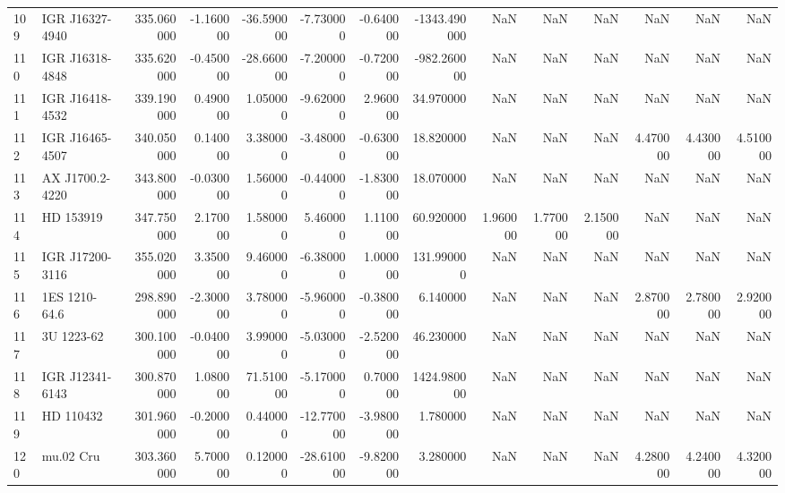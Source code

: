\begin{tabular}{llrrrrrrrrrrrr}
109 & IGR J16327-4940 & 335.060000 & -1.160000 & -36.590000 & -7.730000 & -0.640000 & -1343.490000 & NaN & NaN & NaN & NaN & NaN & NaN \\
110 & IGR J16318-4848 & 335.620000 & -0.450000 & -28.660000 & -7.200000 & -0.720000 & -982.260000 & NaN & NaN & NaN & NaN & NaN & NaN \\
111 & IGR J16418-4532 & 339.190000 & 0.490000 & 1.050000 & -9.620000 & 2.960000 & 34.970000 & NaN & NaN & NaN & NaN & NaN & NaN \\
112 & IGR J16465-4507 & 340.050000 & 0.140000 & 3.380000 & -3.480000 & -0.630000 & 18.820000 & NaN & NaN & NaN & 4.470000 & 4.430000 & 4.510000 \\
113 & AX J1700.2-4220 & 343.800000 & -0.030000 & 1.560000 & -0.440000 & -1.830000 & 18.070000 & NaN & NaN & NaN & NaN & NaN & NaN \\
114 & HD 153919 & 347.750000 & 2.170000 & 1.580000 & 5.460000 & 1.110000 & 60.920000 & 1.960000 & 1.770000 & 2.150000 & NaN & NaN & NaN \\
115 & IGR J17200-3116 & 355.020000 & 3.350000 & 9.460000 & -6.380000 & 1.000000 & 131.990000 & NaN & NaN & NaN & NaN & NaN & NaN \\
116 & 1ES 1210-64.6 & 298.890000 & -2.300000 & 3.780000 & -5.960000 & -0.380000 & 6.140000 & NaN & NaN & NaN & 2.870000 & 2.780000 & 2.920000 \\
117 & 3U 1223-62 & 300.100000 & -0.040000 & 3.990000 & -5.030000 & -2.520000 & 46.230000 & NaN & NaN & NaN & NaN & NaN & NaN \\
118 & IGR J12341-6143 & 300.870000 & 1.080000 & 71.510000 & -5.170000 & 0.700000 & 1424.980000 & NaN & NaN & NaN & NaN & NaN & NaN \\
119 & HD 110432 & 301.960000 & -0.200000 & 0.440000 & -12.770000 & -3.980000 & 1.780000 & NaN & NaN & NaN & NaN & NaN & NaN \\
120 & mu.02 Cru & 303.360000 & 5.700000 & 0.120000 & -28.610000 & -9.820000 & 3.280000 & NaN & NaN & NaN & 4.280000 & 4.240000 & 4.320000 \\
\bottomrule
\end{tabular}
